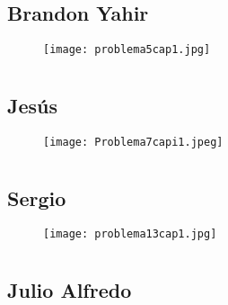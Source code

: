 \documentclass[12pt]{article}
\begin{document}
\section{ }
\subsection{{} Brandon Yahir}

\begin{figure}[htb] 
\centering \texttt{[image: problema5cap1.jpg]} 
\end{figure}

\newpage

\section{ }
\subsection{{} Jesús}

\begin{figure}[htb] 
\centering \texttt{[image: Problema7capi1.jpeg]} 
\end{figure}

\newpage

\section{ }
\subsection{{} Sergio}

\begin{figure}[htb] 
\centering \texttt{[image: problema13cap1.jpg]} 
\end{figure}

\newpage

\section{ }
\subsection{{} Julio Alfredo}
\end{document}
